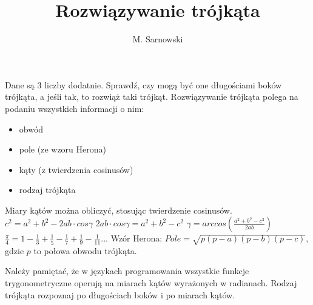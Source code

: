 \documentclass[a4paper,11pt]{article}
\author{M. Sarnowski}
\title{Rozwiązywanie trójkąta}
\begin{document}
\maketitle
Dane są 3 liczby dodatnie. Sprawdź, czy mogą być one długościami boków trójkąta, a jeśli tak, to rozwiąż taki trójkąt. Rozwiązywanie trójkąta polega na podaniu wszystkich informacji o nim:
\begin{itemize}
\item obwód
\item pole (ze wzoru Herona)
\item kąty (z twierdzenia cosinusów)
\item rodzaj trójkąta
\end{itemize}
Miary kątów można obliczyć, stosując twierdzenie cosinusów.
\newline
$c^{2} = a^{2} + b^{2} - 2ab \cdot cos \gamma$
\newline
\newline
$2ab \cdot cos \gamma = a^{2} + b^{2} - c^{2}$
\newline
\newline
$\gamma = arccos \left( \frac{a^{2} + b^{2} - c^{2}}{2ab} \right) $
\newline
\newline
$\frac{\pi}{4} = 1 - \frac{1}{3} + \frac{1}{5} - \frac{1}{7} + \frac{1}{9} -\frac{1}{11}... $
\newline
\newline
Wzór Herona: $Pole = \sqrt{p \left( p - a \right) \left( p - b \right) \left( p - c \right)}$, gdzie $p$ to połowa obwodu trójkąta.
\newline
\newline
\begin{flushleft}
Należy pamiętać, że w językach programowania wszystkie funkcje trygonometryczne operują na miarach kątów wyrażonych w radianach.
\newline
Rodzaj trójkąta rozpoznaj po długościach boków i po miarach kątów.
\end{flushleft}
\end{document}
